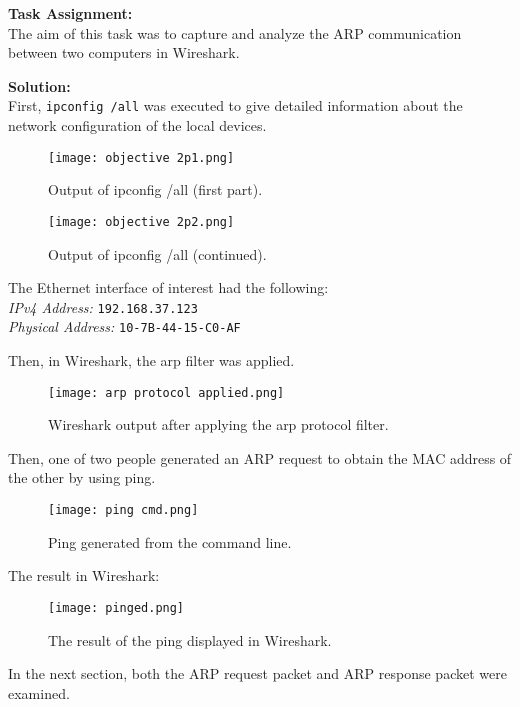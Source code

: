 \documentclass[a4paper,12pt]{article}
\begin{document}
\textbf{Task Assignment:} \\
The aim of this task was to capture and analyze the ARP communication between two computers in Wireshark.

\vspace{0.5 em}
\textbf{Solution:} \\
First, \texttt{ipconfig /all} was executed to give detailed information about the network configuration of the local devices.
\begin{figure}[H]
\centering
\texttt{[image: objective 2p1.png]}
\caption{Output of ipconfig /all (first part).}
\end{figure}

\begin{figure}[H]
\centering
\texttt{[image: objective 2p2.png]}
\caption{Output of ipconfig /all (continued).}
\end{figure}

The Ethernet interface of interest had the following:\\
\textit{IPv4 Address: }\texttt{192.168.37.123}\\
\textit{Physical Address: }\texttt{10-7B-44-15-C0-AF}

Then, in Wireshark, the arp filter was applied.
\begin{figure}[H]
\centering
\texttt{[image: arp protocol applied.png]}
\caption{Wireshark output after applying the arp protocol filter.}
\end{figure}

Then, one of two people generated an ARP request to obtain the MAC address of the other by using ping.
\begin{figure}[H]
\centering
\texttt{[image: ping cmd.png]}
\caption{Ping generated from the command line.}
\end{figure}

The result in Wireshark:
\begin{figure}[H]
\centering
\texttt{[image: pinged.png]}
\caption{The result of the ping displayed in Wireshark.}
\end{figure}


In the next section, both the ARP request packet and ARP response packet were examined.
\pagebreak
\end{document}
